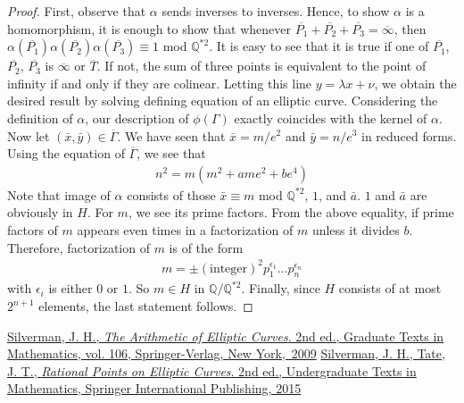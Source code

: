 \documentclass[11pt]{article}
\newcommand{\<}{\langle}
\renewcommand{\>}{\rangle}
\numberwithin{equation}{section}
\theoremstyle{plain}
\theoremstyle{definition}
\begin{document}
    \begin{proof}
        First, observe that \(\alpha\) sends inverses to inverses. Hence, to show \(\alpha\) is a homomorphism, it is enough to show that whenever \(\overline{P_1} + \overline{P_2} + \overline{P_3} = \overline{\infty} \), then \(\alpha(\overline{P_1}) \alpha(\overline{P_2}) \alpha(\overline{P_3} ) \equiv 1\) mod \( \mathbb{Q}^{\ast2}\). It is easy to see that it is true if one of \(\overline{P_1}
        \), \(\overline{P_2}\), \(\overline{P_3}\) is \(\overline{\infty}\) or \(\overline{T}\). If not, the sum of three points is equivalent to the point of infinity if and only if they are colinear. Letting this line \( y = \lambda x + \nu \), we obtain the desired result by solving defining equation of an elliptic curve. Considering the definition of \(\alpha\), our description of \(\phi(\Gamma)\) exactly coincides with the kernel of \(\alpha\). Now let \((\bar{x}, \bar{y}) \in \overline{\Gamma}\). We have seen that \( \bar{x} = m/e^2 \) and \( \bar{y} = n/e^3 \) in reduced forms. Using the equation of \(\overline{\Gamma}\), we see that 
        \begin{align*}
            n^2 = m(m^2 + ame^2 + be^4)
        \end{align*}
        Note that image of \(\alpha\) consists of those \(\bar{x} \equiv m\) mod \(\mathbb{Q}^{\ast2}\), \(1\), and \(\bar{a}\). \(1\) and \(\bar{a}\) are obviously in \(H\). For \(m\), we see its prime factors. From the above equality, if prime factors of \(m\) appears even times in a factorization of \(m\) unless it divides \(b\). Therefore, factorization of \(m\) is of the form
        \begin{align*}
            m = \pm (\text{integer})^2 p_1^{\epsilon_1} \dots p_n^{\epsilon_n}
        \end{align*}
        with \(\epsilon_i\) is either \(0 \) or \(1\). So \(m \in H \) in \(\mathbb{Q}/\mathbb{Q}^{\ast2}\). Finally, since \(H\) consists of at most \(2^{n+1}\) elements, the last statement follows.
    \end{proof}
    
    
    
\begin{thebibliography}{}

\bibitem{}
 \href{https://www.springer.com/la/book/9780387094939}{Silverman, J. H.,
 \emph{The Arithmetic of Elliptic Curves}. 2nd ed.,
 Graduate Texts in Mathematics, vol. 106, Springer-Verlag, New York,~2009}
\bibitem{}
 \href{https://books.google.co.kr/books?id=2_PLCQAAQBAJ&printsec=frontcover&dq=Rational+Points+on+Elliptic+Curves&hl=ko&sa=X&ved=0ahUKEwiahcaz_ZDhAhWUxIsBHfEdBtUQ6AEIMTAB#v=onepage&q=Rational%20Points%20on%20Elliptic%20Curves&f=false}{Silverman, J. H., Tate, J. T.,
 \emph{Rational Points on Elliptic Curves}. 2nd ed., Undergraduate Texts in Mathematics, Springer International Publishing, 2015}
\end{thebibliography}
\end{document}
